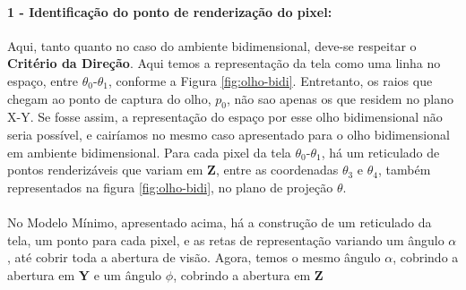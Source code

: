 \documentclass{article}
\begin{document}
	\paragraph{1 - Identificação do ponto de renderização do pixel:}
	Aqui, tanto quanto no caso do ambiente bidimensional, deve-se respeitar o \textbf{Critério da Direção}. Aqui temos a representação da tela como uma linha no espaço, entre $\theta_0$-$\theta_1$, conforme a Figura \ref{fig:olho-bidi}. Entretanto, os raios que chegam ao ponto de captura do olho, $p_0$, não sao apenas os que residem no plano X-Y. Se fosse assim, a representação do espaço por esse olho bidimensional não seria possível, e cairíamos no mesmo caso apresentado para o olho bidimensional em ambiente bidimensional. Para cada pixel da tela $\theta_0$-$\theta_1$, há um reticulado de pontos renderizáveis que variam em \textbf{Z}, entre as coordenadas $\theta_3$ e $\theta_4$, também representados na figura \ref{fig:olho-bidi}, no plano de projeção $\theta$.
	
	\paragraph{}
	No Modelo Mínimo, apresentado acima, há a construção de um reticulado da tela, um ponto para cada pixel, e as retas de representação variando um ângulo $\alpha$, até cobrir toda a abertura de visão. Agora, temos o mesmo ângulo $\alpha$, cobrindo a abertura em \textbf{Y} e um ângulo $\phi$, cobrindo a abertura em \textbf{Z}
	
\end{document}
